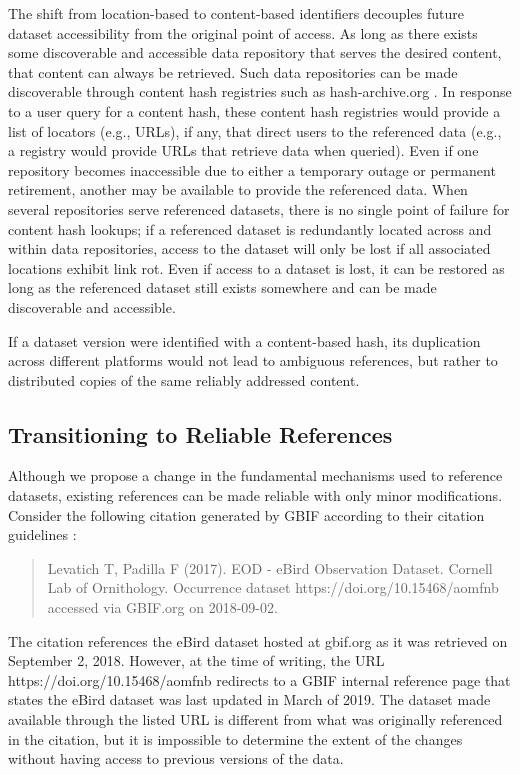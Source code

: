 
The shift from location-based to content-based identifiers decouples future dataset accessibility from the original point of access. As long as there exists some discoverable and accessible data repository that serves the desired content, that content can always be retrieved. Such data repositories can be made discoverable through content hash registries such as hash-archive.org \citep{Trask_2015}. In response to a user query for a content hash, these content hash registries would provide a list of locators (e.g., URLs), if any, that direct users to the referenced data (e.g., a registry would provide URLs that retrieve data when queried). Even if one repository becomes inaccessible due to either a temporary outage or permanent retirement, another may be available to provide the referenced data. When several repositories serve referenced datasets, there is no single point of failure for content hash lookups; if a referenced dataset is redundantly located across and within data repositories, access to the dataset will only be lost if all associated locations exhibit link rot. Even if access to a dataset is lost, it can be restored as long as the referenced dataset still exists somewhere and can be made discoverable and accessible.

If a dataset version were identified with a content-based hash, its duplication across different platforms would not lead to ambiguous references, but rather to distributed copies of the same reliably addressed content.



\subsection*{Transitioning to Reliable References}
Although we propose a change in the fundamental mechanisms used to reference datasets, existing references can be made reliable with only minor modifications. Consider the following citation generated by GBIF according to their citation guidelines :

\begin{quote}
Levatich T, Padilla F (2017). EOD - eBird Observation Dataset. Cornell Lab of Ornithology. Occurrence dataset https://doi.org/10.15468/aomfnb accessed via GBIF.org on 2018-09-02.
\end{quote}

The citation references the eBird dataset hosted at gbif.org as it was retrieved on September 2, 2018. However, at the time of writing, the URL https://doi.org/10.15468/aomfnb redirects to a GBIF internal reference page that states the eBird dataset was last updated in March of 2019. The dataset made available through the listed URL is different from what was originally referenced in the citation, but it is impossible to determine the extent of the changes without having access to previous versions of the data.

